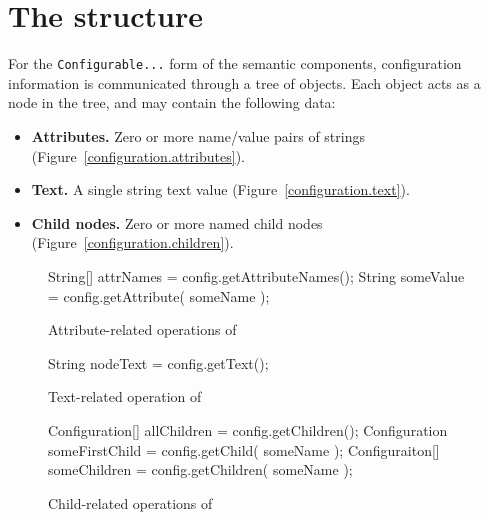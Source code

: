 \subsubsection{}

\section{The  structure}

For the \texttt{Configurable...} form of the semantic components, 
configuration information is communicated through a tree of
 objects.  Each 
object acts as a node in the tree, and may contain the following
data:

\begin{itemize}
  \item \textbf{Attributes.} Zero or more name/value pairs of strings
(Figure~\vref{configuration.attributes}).
  \item \textbf{Text.} A single string text value
(Figure~\vref{configuration.text}).
  \item \textbf{Child  nodes.} Zero or more named
    child  nodes
(Figure~\vref{configuration.children}).
\end{itemize}

\begin{figure}
\begin{javaCodelisting}
String[] attrNames = config.getAttributeNames();
String   someValue = config.getAttribute( someName );
\end{javaCodelisting}
\caption{Attribute-related operations of }
\label{configuration.attributes}
\end{figure}

\begin{figure}
\begin{javaCodelisting}
String nodeText = config.getText();
\end{javaCodelisting}
\caption{Text-related operation of }
\label{configuration.text}
\end{figure}

\begin{figure}
\begin{javaCodelisting}
Configuration[] allChildren    = config.getChildren();
Configuration   someFirstChild = config.getChild( someName );
Configuraiton[] someChildren   = config.getChildren( someName );
\end{javaCodelisting}
\caption{Child-related operations of }
\label{configuration.children}
\end{figure}

